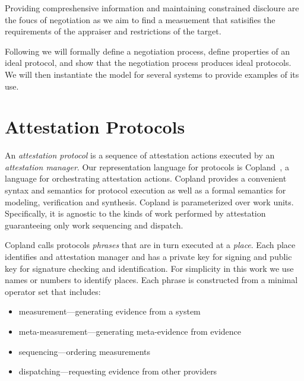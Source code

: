 \documentclass[sigconf,authordraft]{acmart}
\begin{document}
Providing compreshensive information and maintaining constrained
discloure are the foucs of negotiation as we aim to find a measuement
that satisifies the requirements of the appraiser and restrictions of
the target.

Following we will formally define a negotiation process, define
properties of an ideal protocol, and show that the negotiation process
produces ideal protocols.  We will then instantiate the model for
several systems to provide examples of its use.


\section{Attestation Protocols}

An \emph{attestation protocol} is a sequence of attestation actions
executed by an \emph{attestation manager}. Our representation language
for protocols is Copland~\citep{Ramsdell:2019aa}, a language for
orchestrating attestation actions.  Copland provides a convenient
syntax and semantics for protocol execution as well as a formal
semantics for modeling, verification and synthesis.  Copland is
parameterized over work units.  Specifically, it is agnostic to the
kinds of work performed by attestation guaranteeing only work
sequencing and dispatch.


Copland calls protocols \emph{phrases} that are in turn executed at a
\emph{place}.  Each place identifies and attestation manager and has a
private key for signing and public key for signature checking and
identification.  For simplicity in this work we use names or numbers
to identify places.  Each phrase is constructed from a minimal
operator set that includes:

\begin{itemize}
  \squash
\item measurement---generating evidence from a system
\item meta-measurement---generating meta-evidence from evidence
\item sequencing---ordering measurements
\item dispatching---requesting evidence from other providers
\end{itemize}
\end{document}
